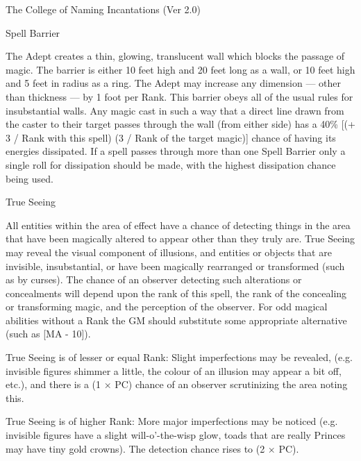 \begin{Chapter}{The College of Naming Incantations (Ver 2.0)}
\begin{spell}[S-9]{Spell Barrier}
\begin{effects}
The Adept creates a thin, glowing, translucent wall which blocks the
passage of magic.  The barrier is either 10 feet high and 20 feet long
as a wall, or 10 feet high and 5 feet in radius as a ring.  The Adept
may increase any dimension — other than thickness — by 1 foot per
Rank. This barrier obeys all of the usual rules for insubstantial
walls.  Any magic cast in such a way that a direct line drawn from the
caster to their target passes through the wall (from either side) has
a 40\% [(+ 3 / Rank with this spell) (3 / Rank of the target magic)]
chance of having its energies dissipated.  If a spell passes through
more than one Spell Barrier only a single roll for dissipation should
be made, with the highest dissipation chance being used.
\end{effects}
\end{spell}

\begin{spell}[S-10]{True Seeing}

\begin{effects}
All entities within the area of effect have a chance of detecting
things in the area that have been magically altered to appear other
than they truly are.  True Seeing may reveal the visual component of
illusions, and entities or objects that are invisible, insubstantial,
or have been magically rearranged or transformed (such as by
curses). The chance of an observer detecting such alterations or
concealments will depend upon the rank of this spell, the rank of the
concealing or transforming magic, and the perception of the
observer. For odd magical abilities without a Rank the GM should
substitute some appropriate alternative (such as [MA - 10]).

True Seeing is of lesser or equal Rank: Slight imperfections may be
revealed, (e.g. invisible figures shimmer a little, the colour of an
illusion may appear a bit off, etc.), and there is a (1 × PC) chance
of an observer scrutinizing the area noting this.

True Seeing is of higher Rank: More major imperfections may be noticed
(e.g. invisible figures have a slight will-o’-the-wisp glow, toads
that are really Princes may have tiny gold crowns).  The detection
chance rises to (2 × PC).


\end{effects}
\end{spell}
\end{Chapter}
